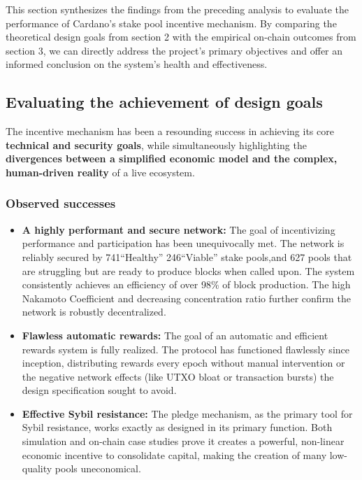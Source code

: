 \documentclass[11pt, letterpaper]{article}
\begin{document}
This section synthesizes the findings from the preceding analysis to evaluate the
performance of Cardano's stake pool incentive mechanism. By comparing the theoretical
design goals from section 2 with the empirical on-chain outcomes from section 3, we
can directly address the project's primary objectives and offer an informed conclusion
on the system's health and effectiveness.

\subsection{Evaluating the achievement of design goals}
\label{sec:evaluating-goals}

The incentive mechanism has been a resounding success in achieving its core
\textbf{technical and security goals}, while simultaneously highlighting the
\textbf{divergences between a simplified economic model and the complex, human-driven reality}
of a live ecosystem.

\subsubsection{Observed successes}

\begin{itemize}
	\item \textbf{A highly performant and secure network:} The goal of incentivizing performance
	      and participation has been unequivocally met. The network is reliably secured by 741``Healthy''
	      246``Viable'' stake pools,and 627 pools that are struggling but are ready to produce blocks when called upon.
	      The system consistently achieves an efficiency of over 98\% of block production. The high Nakamoto Coefficient and decreasing concentration ratio further confirm the network is robustly decentralized.
	\item \textbf{Flawless automatic rewards:} The goal of an automatic and efficient rewards system is fully
	      realized. The protocol has functioned flawlessly since inception, distributing rewards every epoch
	      without manual intervention or the negative network effects (like UTXO bloat or transaction bursts) the
	      design specification sought to avoid.
	\item \textbf{Effective Sybil resistance:} The pledge mechanism, as the primary tool for Sybil resistance,
	      works exactly as designed in its primary function. Both simulation and on-chain case studies prove
	      it creates a powerful, non-linear economic incentive to consolidate capital, making the creation
	      of many low-quality pools uneconomical.
\end{itemize}
\end{document}
